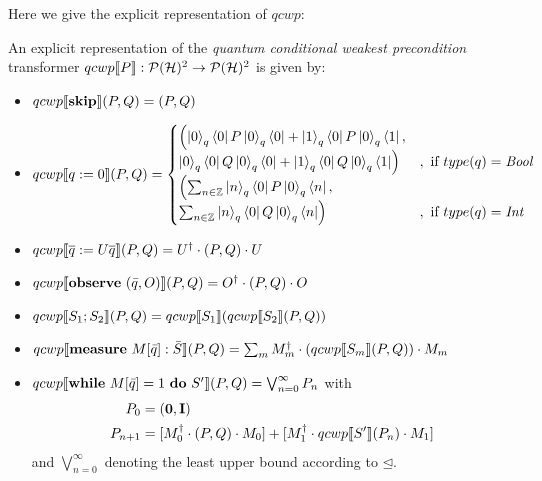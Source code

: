 \documentclass[a4paper,UKenglish,cleveref, autoref, thm-restate]{lipics-v2021}
\begin{document}
Here we give the explicit representation of $qcwp$:
\begin{lemma}
    \label{lem:explicitCWP}
    An explicit representation of the \textit{quantum conditional weakest precondition} transformer $qcwp\llbracket P \rrbracket: \mathcal{P}(\mathcal{H})^2\to \mathcal{P}(\mathcal{H})^2$ is given by:
\begin{itemize}
    \item $qcwp\llbracket \mathbf{skip} \rrbracket (P,Q)=(P,Q)$
    \item $qcwp\llbracket q:=0 \rrbracket (P,Q)=
    \begin{cases}
        \Bigl( \ket{0}_q\bra{0}P\ket{0}_q \bra{0} + \ket{1}_q\bra{0} P \ket{0}_q \bra{1}, &\\
        \ket{0}_q\bra{0}Q\ket{0}_q \bra{0} + \ket{1}_q\bra{0} Q \ket{0}_q \bra{1} \Bigr)
         &,\text{ if }type(q)=\mathit{Bool} \\
         \Bigl( \sum_{n\in \mathbb{Z}} \ket{n}_q \bra{0} P \ket{0}_q\bra{n},&\\
          \sum_{n\in \mathbb{Z}} \ket{n}_q \bra{0} Q \ket{0}_q \bra{n}\Bigr)
        & ,\text{ if }type(q)=\mathit{Int}
    \end{cases}$
    \item $qcwp\llbracket \overline{q}:= U\overline{q} \rrbracket (P,Q)= U^\dagger \cdot (P,Q) \cdot U$
    \item $qcwp\llbracket  \mathbf{observe } \text{ }(\Bar{q},O) \rrbracket (P,Q) = O^\dagger \cdot (P,Q) \cdot O$
    \item $qcwp\llbracket S_1;S_2 \rrbracket (P,Q)=qcwp\llbracket S_1 \rrbracket (qcwp\llbracket S_2 \rrbracket (P,Q) )  $
    \item $qcwp\llbracket \mathbf{measure } \text{ }M[\Bar{q}]:\Bar{S} \rrbracket (P,Q) = \sum_m M_m^\dagger\cdot (qcwp\llbracket S_m \rrbracket (P,Q))\cdot M_m$
    \item $qcwp\llbracket \mathbf{while } \text{ }M[\Bar{q}]=1 \text{ }\mathbf{ do } \text{ }S' \rrbracket (P,Q)= \bigvee_{n=0}^\infty P_n$ with
    \begin{align*}
        P_0  &= (\mathbf{0},\textbf{I})\\
        P_{n+1} &= [M_0^\dagger \cdot (P,Q) \cdot M_0] + [M_1^\dagger \cdot qcwp\llbracket S' \rrbracket (P_n) \cdot M_1]
    \end{align*}
    and $\bigvee_{n=0}^\infty$ denoting the least upper bound according to $\unlhd$.
\end{itemize}
\end{lemma}
\end{document}
